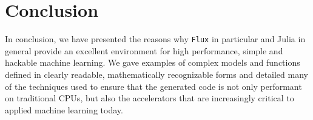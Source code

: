 \documentclass{juliacon}
\begin{document}
\section{Conclusion}

In conclusion, we have presented the reasons why \texttt{Flux} in particular and Julia in general provide an excellent environment for high performance, simple and hackable machine learning.  We gave examples of complex models and functions defined in clearly readable, mathematically recognizable forms and detailed many of the techniques used to ensure that the generated code is not only performant on traditional CPUs, but also the accelerators that are increasingly critical to applied machine learning today.


\end{document}
